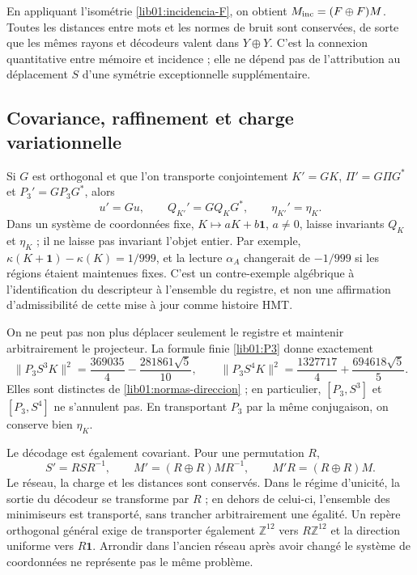 En appliquant l’isométrie \eqref{lib01:incidencia-F}, on obtient
\(M_{\rm inc}=(F\oplus F)M\). Toutes les distances entre mots
et les normes de bruit sont conservées, de sorte que les mêmes rayons et
décodeurs valent dans \(Y\oplus Y\). C’est la connexion
quantitative entre mémoire et incidence ; elle ne dépend pas de l’attribution au
déplacement \(S\) d’une symétrie exceptionnelle supplémentaire.

\subsection{Covariance, raffinement et charge variationnelle}
\label{lib01:covarianza}

Si \(G\) est orthogonal et que l'on transporte conjointement \(K'=GK\), \(\Pi'=G\Pi G^*\) et \(P_3'=GP_3G^*\), alors
\[
 u'=Gu,\qquad Q_{K'}'=GQ_KG^*,\qquad \eta_{K'}'=\eta_K.
\]
Dans un système de coordonnées fixe, \(K\mapsto aK+b\mathbf1\), \(a\ne0\), laisse
invariants \(Q_K\) et \(\eta_K\) ; il ne laisse pas invariant l’objet entier.
Par exemple, \(\kappa(K+\mathbf1)-\kappa(K)=1/999\), et la lecture
\(\alpha_A\) changerait de \(-1/999\) si les
régions étaient maintenues fixes. C’est un contre-exemple algébrique à l’identification du descripteur à
l’ensemble du registre, et non une affirmation d’admissibilité de cette mise à jour
comme histoire HMT.

On ne peut pas non plus déplacer seulement le registre et maintenir arbitrairement le
projecteur. La formule finie \eqref{lib01:P3} donne exactement
\[
 \|P_3S^3K\|^2=\frac{369035}{4}-\frac{281861\sqrt5}{10},
 \qquad
 \|P_3S^4K\|^2=\frac{1327717}{4}+\frac{694618\sqrt5}{5}.
\]
Elles sont distinctes de \eqref{lib01:normas-direccion} ; en particulier,
\([P_3,S^3]\) et \([P_3,S^4]\) ne s’annulent pas. En transportant
\(P_3\) par la même conjugaison, on conserve bien \(\eta_K\).

Le décodage est également covariant. Pour une permutation \(R\),
\[
 S'=RSR^{-1},\qquad M'=(R\oplus R)MR^{-1},\qquad
 M'R=(R\oplus R)M.
\]
Le réseau, la charge et les distances sont conservés. Dans le régime d’unicité,
la sortie du décodeur se transforme par \(R\) ; en dehors de celui-ci,
l’ensemble des minimiseurs est transporté, sans trancher arbitrairement
une égalité. Un repère orthogonal général exige de transporter également
\(\mathbb Z^{12}\) vers \(R\mathbb Z^{12}\) et la direction uniforme
vers \(R\mathbf1\). Arrondir dans l’ancien réseau après avoir changé le
système de coordonnées ne représente pas le même problème.

